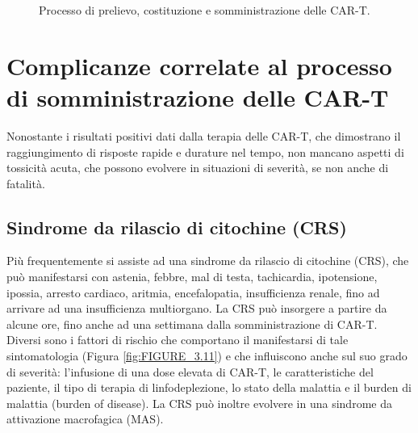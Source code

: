\begin{figure}[H]
    \begin{center}
    \vspace{-3mm}
    \end{center}
    \caption{Processo di prelievo, costituzione e somministrazione delle CAR-T.
    \cite{LLSCART}}
    \label{fig:FIGURE_5.2}
\end{figure}

\section{Complicanze correlate al processo di somministrazione delle CAR-T}

Nonostante i risultati positivi dati dalla terapia delle CAR-T, che dimostrano il raggiungimento di risposte rapide e 
durature nel tempo, non mancano aspetti di tossicità acuta, che possono evolvere in situazioni di severità, se non 
anche di fatalità\cite{EMATOCART}.

\subsection{Sindrome da rilascio di citochine (CRS)}

Più frequentemente si assiste ad una sindrome da rilascio di citochine (CRS), che può manifestarsi con 
astenia, febbre, mal di testa, tachicardia, ipotensione, ipossia, arresto cardiaco, aritmia, 
encefalopatia, insufficienza renale, fino ad arrivare ad una insufficienza multiorgano.
La CRS può insorgere a partire da alcune ore, fino anche ad una settimana dalla somministrazione di CAR-T\cite{EMATOCART}.\\
Diversi sono i fattori di rischio che comportano il manifestarsi di tale sintomatologia (Figura \ref{fig:FIGURE_3.11}) 
e che influiscono anche sul suo grado di severità: l'infusione di una dose elevata di CAR-T, le caratteristiche 
del paziente, il tipo di terapia di linfodeplezione, lo stato della malattia e il burden di malattia 
(burden of disease)\cite{EMATOCART}.
La CRS può inoltre evolvere in una sindrome da attivazione macrofagica (MAS).

